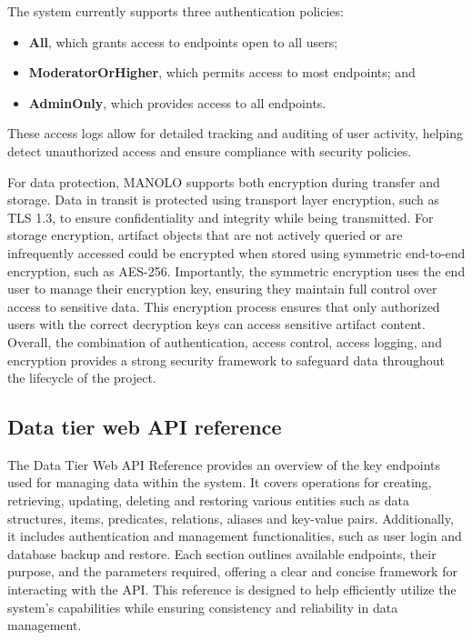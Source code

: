 The system currently supports three authentication policies:
\begin{itemize}
    \setlength{\itemsep}{0pt}
    \setlength{\parskip}{0pt}
    \item \textbf{All}, which grants access to endpoints open to all users;
    \item \textbf{ModeratorOrHigher}, which permits access to most endpoints; and
    \item \textbf{AdminOnly}, which provides access to all endpoints.
\end{itemize}

These access logs allow for detailed tracking and auditing of user activity, helping detect unauthorized access and ensure compliance with security policies.

For data protection, MANOLO supports both encryption during transfer and storage. Data in transit is protected using transport layer encryption, such as TLS 1.3, to ensure confidentiality and integrity while being transmitted. For storage encryption, artifact objects that are not actively queried or are infrequently accessed could be encrypted when stored using symmetric end-to-end encryption, such as AES-256. Importantly, the symmetric encryption uses the end user to manage their encryption key, ensuring they maintain full control over access to sensitive data. This encryption process ensures that only authorized users with the correct decryption keys can access sensitive artifact content. Overall, the combination of authentication, access control, access logging, and encryption provides a strong security framework to safeguard data throughout the lifecycle of the project.

\subsection{Data tier web API reference}
The Data Tier Web API Reference provides an overview of the key endpoints used for managing data within the system. It covers operations for creating, retrieving, updating, deleting and restoring various entities such as data structures, items, predicates, relations, aliases and key-value pairs. Additionally, it includes authentication and management functionalities, such as user login and database backup and restore. Each section outlines available endpoints, their purpose, and the parameters required, offering a clear and concise framework for interacting with the API. This reference is designed to help efficiently utilize the system’s capabilities while ensuring consistency and reliability in data management.


